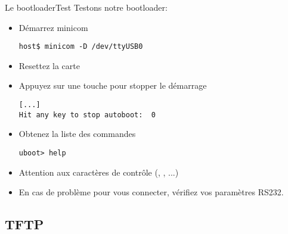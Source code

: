 \begin{frame}[fragile=singleslide]{Le bootloader}{Test}
  Testons notre bootloader:
  \begin{itemize}
    \item Démarrez minicom
    \begin{lstlisting}
host$ minicom -D /dev/ttyUSB0
    \end{lstlisting}
  \item Resettez la carte
  \item Appuyez sur une touche pour stopper le démarrage
    \begin{lstlisting}
[...]
Hit any key to stop autoboot:  0
    \end{lstlisting}
  \item Obtenez la liste des commandes
    \begin{lstlisting}
uboot> help
    \end{lstlisting}
  \item Attention aux caractères de contrôle (, , ...)\\
  \item En  cas de  problème pour  vous connecter,  vérifiez  vos paramètres
  RS232.
  \end{itemize}
\end{frame}

\subsection{TFTP}

